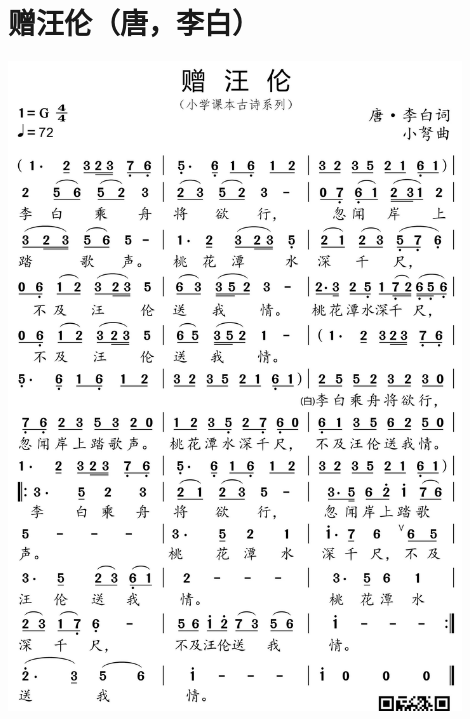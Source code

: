 \documentclass[cn,pad,chinesefont=nofont,twocol]{elegantbook}
\begin{document}
\section{赠汪伦（唐，李白）}
    \includegraphics[width=0.9\textwidth]{dongxiao/20200627-古诗-赠汪伦.jpg}   
\end{document}
